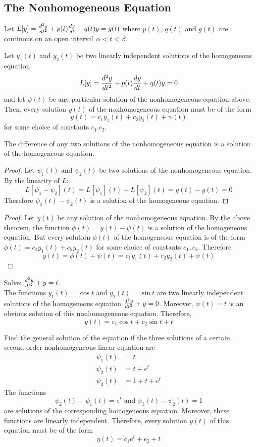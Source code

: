 \documentclass[12pt]{article}
\begin{document}
\subsection{The Nonhomogeneous Equation} 
Let $L[y] = \frac{d^2y}{dt^2} + p(t)\frac{dy}{dt} + q(t)y = g(t)$ where $p(t)$, $q(t)$ and $g(t)$ are continous on an open interval $\alpha < t < \beta$. 
\begin{theorem} Let $y_1(t)$ and $y_2(t)$ be two linearly independent solutions of the homogeneous equation $$L[y] = \frac{d^2y}{dt^2} + p(t)\frac{dy}{dt} + q(t)y = 0$$ and let $\psi(t)$ be any particular solution of the nonhomogeneous equation above. Then, every solution $y(t)$ of the nonhomogeneous equation must be of the form $$y(t) = c_1y_1(t) + c_2y_2(t) + \psi(t)$$ for some choice of constants $c_1. c_2$. \end{theorem} 
\begin{theorem} The difference of any two solutions of the nonhomogeneous equation is a solution of the homogeneous equation. \end{theorem} 
\begin{proof} Let $\psi_1(t)$ and $\psi_2(t)$ be two solutions of the nonhomogeneous equation. By the linearity of $L$: 
$$ L[\psi_1 - \psi_2](t) = L[\psi_1](t) - L[\psi_2](t) = g(t) - g(t) = 0 $$ Therefore $\psi_1(t) - \psi_2(t)$ is a solution of the homogeneous equation.  \end{proof} 
\begin{proof} Let $y(t)$ be any solution of the nonhomogeneous equation. By the above theorem, the function $\phi(t) = y(t) - \psi(t)$ is a solution of the homogeneous equation. But every solution $\phi(t)$ of the homogeneous equation is of the form $\phi(t) = c_1y_1(t) + c_2y_2(t)$ for some choice of constants $c_1, c_2$. Therefore $$y(t) = \phi(t) + \psi(t) = c_1y_1(t) + c_2y_2(t) + \psi(t) $$ \end{proof} 
\begin{example} Solve: $\frac{d^2y}{dt^2} + y = t$. \\ 
The functions $y_1(t) = \cos t$ and $y_2(t) = \sin t$ are two linearly independent solutions of the homogeneous equation $\frac{d^2y}{dt^2} + y = 0$. Moreover, $\psi(t) = t$ is an obvious solution of this nonhomogeneous equation. Therefore, $$y(t) = c_1\cos t + c_2\sin t + t $$ \end{example} 
\begin{example} Find the general solution of the equation if the three solutions of a certain second-order nonhomogeneous linear equation are $$ \begin{aligned} \psi_1(t) &= t \\ \psi_2(t) &= t + e^t \\ \psi_3(t) &= 1 + t + e^t \end{aligned} $$ 
The functions $$\psi_2(t) - \psi_1(t) = e^t \text{ and } \psi_3(t) - \psi_2(t) = 1$$ are solutions of the corresponding homogeneous equation. Moreover, these functions are linearly independent. Therefore, every solution $y(t)$ of this equation must be of the form $$ y(t) = c_1e^t + e_2 + t $$ \end{example} 
\end{document}
